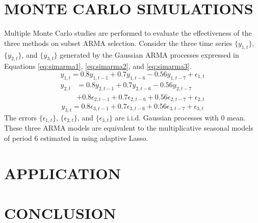 \section{MONTE CARLO SIMULATIONS}
Multiple Monte Carlo studies are performed to evaluate the effectiveness of the three methods on subset ARMA selection. Consider the three time series $\{y_{1,t}\}$, $\{y_{2,t}\}$, and $\{y_{3,t}\}$ generated by the Gaussian ARMA processes expressed in Equations \ref{eq:simarma1}, \ref{eq:simarma2}, and \ref{eq:simarma3}.
\begin{equation}
	\label{eq:simarma1}
	y_{1,t}=0.8y_{1,t-1}+0.7y_{1,t-6}-0.56y_{1,t-7}+\epsilon_{1,t}
\end{equation}
\begin{equation}
	\begin{split}
	\label{eq:simarma2}
	y_{2,t}&=0.8y_{2,t-1}+0.7y_{2,t-6}-0.56y_{2,t-7}\\
	&+0.8\epsilon_{2,t-1}+0.7\epsilon_{2,t-6}+0.56\epsilon_{2,t-7}+\epsilon_{2,t}
	\end{split}
\end{equation}
\begin{equation}
	\label{eq:simarma3}
	y_{3,t}=0.8\epsilon_{3,t-1}+0.7\epsilon_{3,t-6}+0.56\epsilon_{3,t-7}+\epsilon_{3,t}
\end{equation}
The errors $\{\epsilon_{1,t}\}$, $\{\epsilon_{2,t}\}$, and $\{\epsilon_{3,t}\}$ are i.i.d. Gaussian processes with $0$ mean. These three ARMA models are equivalent to the multiplicative seasonal models of period 6 estimated in \cite{Chen2011} using adaptive Lasso. 





\section{APPLICATION}






\section{CONCLUSION}
